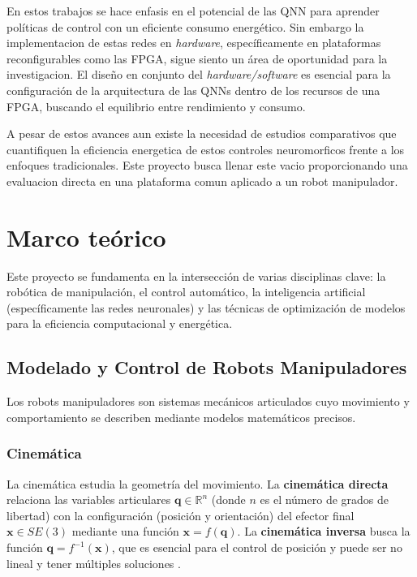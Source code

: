 \documentclass[12pt]{article}
\begin{document}
En estos trabajos se hace enfasis en el potencial de las QNN para aprender políticas de control con un eficiente consumo energético. Sin embargo la implementacion de estas redes en \textit{hardware}, específicamente en plataformas reconfigurables como las FPGA, sigue siento un área de oportunidad para la investigacion. El diseño en conjunto del \textit{hardware/software} es esencial para la configuración de la arquitectura de las QNNs dentro de los recursos de una FPGA, buscando el equilibrio entre rendimiento y consumo\cite{Zhang2025jlpea}.

A pesar de estos avances aun existe la necesidad de estudios comparativos que cuantifiquen la eficiencia energetica de estos controles neuromorficos frente a los enfoques tradicionales. Este proyecto busca llenar este vacio proporcionando una evaluacion directa en una plataforma comun aplicado a un robot manipulador.
\section{Marco teórico}

Este proyecto se fundamenta en la intersección de varias disciplinas clave: la robótica de manipulación, el control automático, la inteligencia artificial (específicamente las redes neuronales) y las técnicas de optimización de modelos para la eficiencia computacional y energética.

\subsection{Modelado y Control de Robots Manipuladores}
\label{ssec:modelado_control_robots}

Los robots manipuladores son sistemas mecánicos articulados cuyo movimiento y comportamiento se describen mediante modelos matemáticos precisos.

\subsubsection{Cinemática}
\label{sssec:cinematica_robots}
La cinemática estudia la geometría del movimiento. La \textbf{cinemática directa} relaciona las variables articulares $\bm{q} \in \mathbb{R}^n$ (donde $n$ es el número de grados de libertad) con la configuración (posición y orientación) del efector final $\bm{x} \in SE(3)$ mediante una función $\bm{x} = f(\bm{q})$. La \textbf{cinemática inversa} busca la función $\bm{q} = f^{-1}(\bm{x})$, que es esencial para el control de posición y puede ser no lineal y tener múltiples soluciones \cite{modern_robotics}.
\end{document}
